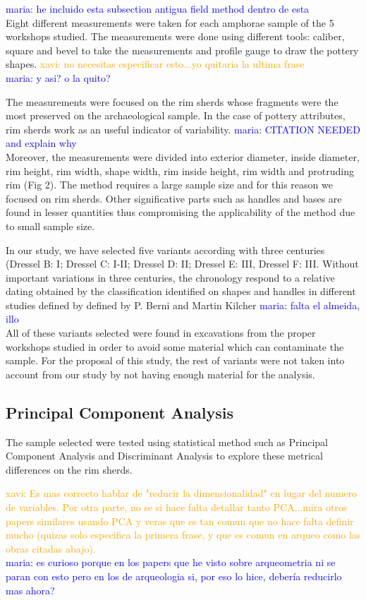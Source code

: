 \documentclass[review]{elsarticle}
\newcommand{\memo}[2]{\textcolor{#1}{#2}}
\newcommand{\xavi}[1]{\memo{orange}{xavi: #1\\}}
\newcommand{\maria}[1]{\memo{blue}{maria: #1\\}}
\begin{document}
\maria{he incluido esta subsection antigua field method dentro de esta}
Eight different measurements were taken for each amphorae sample of the 5 workshops studied. The measurements were done using different tools: caliber, square and bevel to take the measurements and profile gauge to draw the pottery shapes. \xavi{no necesitas especificar esto...yo quitaria la ultima frase} \maria{y asi? o la quito?}

The measurements were focused on the rim sherds whose fragments were the most preserved on the archaeological sample. In the case of pottery attributes, rim sherds work as an useful indicator of variability. \maria{CITATION NEEDED and explain why}
Moreover, the measurements were divided into exterior diameter, inside diameter, rim height, rim width, shape width, rim inside height, rim width and protruding rim (Fig 2). The method requires a large sample size and for this reason we focused on rim sherds. Other significative parts such as handles and bases are found in lesser quantities thus compromising the applicability of the method due to small sample size.

In our study, we have selected five variants according with three centuries
(Dressel B: I; Dressel C: I-II; Dressel D: II; Dressel E: III, Dressel F: III. Without important variations in three centuries, the chronology respond to a relative dating obtained by the classification identified on shapes and handles in different studies defined by defined by P. Berni \citep{berni_millet_epigrafianforica_2008} and Martin Kilcher \citep{martin-kilcher_romischen_1994} \maria{falta el almeida, illo}All of these variants selected were found in excavations from the proper workshops studied in order to avoid some material which can contaminate the sample. For the proposal of this study, the rest of variants were not taken into account from our study by not having enough material for the analysis. 


\subsection{Principal Component Analysis}

The sample selected were tested using statistical method such as Principal Component Analysis and Discriminant Analysis to explore these metrical differences on the rim sherds. 

\xavi{Es mas correcto hablar de "reducir la dimensionalidad" en lugar del numero de variables. Por otra parte, no se si hace falta detallar tanto PCA...mira otros papers similares usando PCA y veras que es tan comun que no hace falta definir mucho (quizas solo especifica la primera frase, y que es comun en arqueo como las obras citadas abajo).}
\maria{es curioso porque en los papers que he visto sobre arqueometria ni se paran con esto pero en los de arqueologia si, por eso lo hice, debería reducirlo mas ahora?}
\end{document}
